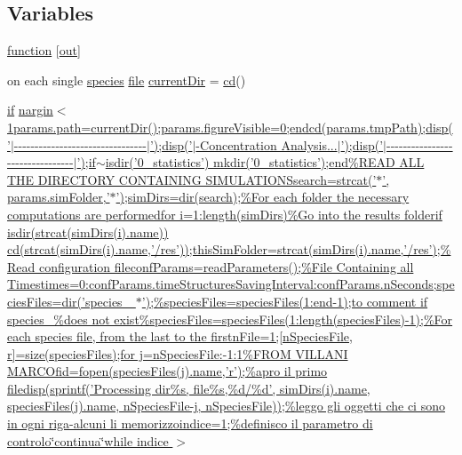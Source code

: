 \subsection*{Variables}
\begin{DoxyCompactItemize}
\item 
\hyperlink{a00025_a370f3dd25136a73d619eba0aa2e3bb4b}{function} \mbox{[}\hyperlink{a00028_a34c820385e9209f49c18739329ad9206}{out}\mbox{]}
\item 
on each single \hyperlink{a00022}{species} \hyperlink{a00110_a4e8353d6c62cf54bf4a1a8f63e56b8c3}{file} \hyperlink{a00025_afb60cd67e28ca8c9fa44e4f5452589b9}{current\-Dir} = \hyperlink{a00110_a767271ad82d244871370a0f0e6a7f8a4}{cd}()
\item 
\hyperlink{a00030_a01d55766b8058903dd360b4bda71f9f5}{if} \hyperlink{a00025_a389644115bfaaa246f363dc22d48bf07}{nargin$<$ 1params.\-path=current\-Dir();params.\-figure\-Visible=0;endcd(params.\-tmp\-Path);disp('$|$-\/-\/-\/-\/-\/-\/-\/-\/-\/-\/-\/-\/-\/-\/-\/-\/-\/-\/-\/-\/-\/-\/-\/-\/-\/-\/-\/-\/-\/-\/-\/-\/$|$');disp('$|$-\/\-Concentration Analysis...$|$');disp('$|$-\/-\/-\/-\/-\/-\/-\/-\/-\/-\/-\/-\/-\/-\/-\/-\/-\/-\/-\/-\/-\/-\/-\/-\/-\/-\/-\/-\/-\/-\/-\/-\/$|$');if$\sim$isdir('0\-\_\-statistics') mkdir('0\-\_\-statistics');end\%\-R\-E\-A\-D A\-L\-L T\-H\-E D\-I\-R\-E\-C\-T\-O\-R\-Y C\-O\-N\-T\-A\-I\-N\-I\-N\-G S\-I\-M\-U\-L\-A\-T\-I\-O\-N\-Ssearch=strcat('$\ast$', params.\-sim\-Folder,'$\ast$');sim\-Dirs=dir(search);\%\-For each folder the necessary computations are performedfor i=1\-:length(sim\-Dirs)\%\-Go into the results folderif isdir(strcat(sim\-Dirs(i).\-name)) cd(strcat(sim\-Dirs(i).\-name,'/res'));this\-Sim\-Folder=strcat(sim\-Dirs(i).\-name,'/res');\%\-Read configuration fileconf\-Params=read\-Parameters();\%\-File Containing all Timestimes=0\-:conf\-Params.\-time\-Structures\-Saving\-Interval\-:conf\-Params.\-n\-Seconds;species\-Files=dir('species\-\_\- $\ast$');\%species\-Files=species\-Files(1\-:end-\/1);to comment if species\-\_\%does not exist\%species\-Files=species\-Files(1\-:length(species\-Files)-\/1);\%\-For each species file, from the last to the firstn\-File=1;\mbox{[}n\-Species\-File, r\mbox{]}=size(species\-Files);for j=n\-Species\-File\-:-\/1\-:1\%\-F\-R\-O\-M V\-I\-L\-L\-A\-N\-I M\-A\-R\-C\-Ofid=fopen(species\-Files(j).\-name,'r');\%apro il primo filedisp(sprintf('\-Processing dir\%s, file\%s,\%d/\%d', sim\-Dirs(i).\-name, species\-Files(j).\-name, n\-Species\-File-\/j, n\-Species\-File));\%leggo gli oggetti che ci sono in ogni riga-\/alcuni li memorizzoindice=1;\%definisco il parametro di controlo\char`\"{}continua\char`\"{}while indice $>$}

\end{DoxyCompactItemize}
